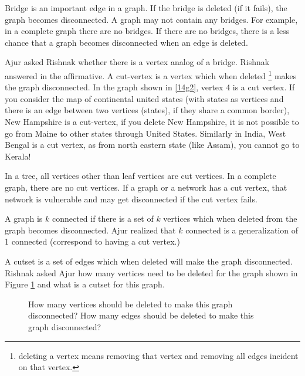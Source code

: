 Bridge is an important edge in a graph. If the bridge is deleted (if it fails), the graph becomes disconnected. A graph may not contain any bridges. For example, in a complete graph  there are no
bridges. If there are no bridges, there is a less chance that a graph becomes disconnected when an edge is deleted.

Ajur asked Rishnak whether there is a vertex analog of a bridge. Rishnak answered in the affirmative. A cut-vertex is a vertex which when deleted \footnote{deleting a vertex means removing that vertex and removing all edges incident on that vertex.} makes the graph disconnected. In the graph shown in \ref{14g2}, vertex 4 is a cut vertex. If you consider the map of continental united states (with states as vertices and there is an edge between two vertices (states), if they share a common border), New Hampshire is a cut-vertex, if you delete New Hampshire, it is not possible to go from Maine to other states through United States. Similarly in India, West Bengal is  a cut vertex, as from north eastern state (like Assam), you cannot go to Kerala!

In a tree, all vertices other than leaf vertices are cut vertices. In a complete graph, there are no cut vertices. If a graph or a network has a cut vertex, that network is vulnerable and may get disconnected if the cut vertex fails. 

A graph is $k$ connected if there is a set of $k$ vertices which when deleted from the graph becomes disconnected. Ajur realized that $k$ connected is a generalization of 1 connected (correspond to having a cut vertex.)

A cutset is a set of edges which when deleted will make the graph disconnected. Rishnak asked Ajur how many vertices need to be deleted for the graph shown in Figure \ref{14g3} and what is a cutset for this graph.

\begin{figure}
\begin{center}

\caption{How many vertices should be deleted to make this graph disconnected? How many edges should be deleted to make this graph disconnected? }\label{14g3}
\end{center}
\end{figure}

